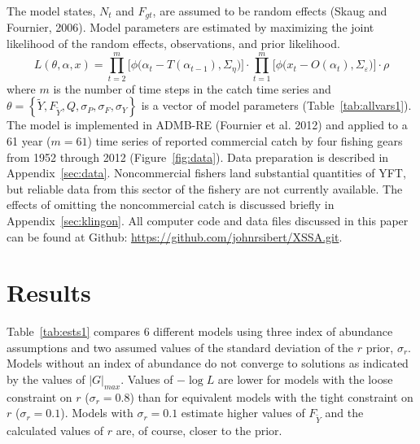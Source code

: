 \documentclass[12pt,letterpaper]{article}
\newcommand\MSY{\widetilde{Y}}
\newcommand\Fmsy{F_{\MSY}}
\begin{document}
The model states, $N_t$ and $F_{gt}$, are assumed to be random
effects (Skaug and Fournier, 2006). Model parameters are estimated by
maximizing the joint likelihood of the random
effects, observations, and prior likelihood.
\begin{equation}
\label{eqn:likelihood}
L(\theta,\alpha,x)=
\prod^m_{t=2}\big[\phi\big(\alpha_t-T(\alpha_{t-1}), \Sigma_\eta\big)\big]\cdot
\prod^m_{t=1}\big[\phi\big(x_t-O(\alpha_t),
\Sigma_\varepsilon\big)\big]\cdot\rho
\end{equation}
where $m$ is the number of time steps in the catch time series and
$\theta=\left\{\MSY,\Fmsy,Q,\sigma_P,\sigma_F,\sigma_Y\right\}$ 
is a vector of model parameters (Table~\ref{tab:allvars1}).
The model is implemented in ADMB-RE (Fournier et al. 2012) and
applied to a 61 year ($m=61$) time series of reported commercial
catch by four fishing gears from 1952 through 2012
(Figure~\ref{fig:data}).
Data preparation is described in Appendix~\ref{sec:data}.
Noncommercial fishers land substantial quantities of YFT, but
reliable data from this sector of the fishery are not currently
available. The effects of omitting the noncommercial catch is
discussed briefly in Appendix~\ref{sec:klingon}.
All computer code and data files discussed in this
paper can be found at Github:
\url{https://github.com/johnrsibert/XSSA.git}.

\section*{Results}
Table~\ref{tab:ests1} compares 6 different models
using three index of abundance assumptions and two 
assumed values of the standard deviation of the $r$ prior, $\sigma_r$. 
Models without an index of abundance do not converge to solutions as
indicated by the values of $|G|_{max}$.
Values of $-\log L$ are lower for models with the loose constraint on $r$
($\sigma_r=0.8$) than for equivalent models with the tight constraint on $r$
($\sigma_r=0.1$).
Models with $\sigma_r=0.1$ estimate higher values of $\Fmsy$ and the
calculated values of $r$ are, of course, closer to the prior.
\end{document}
